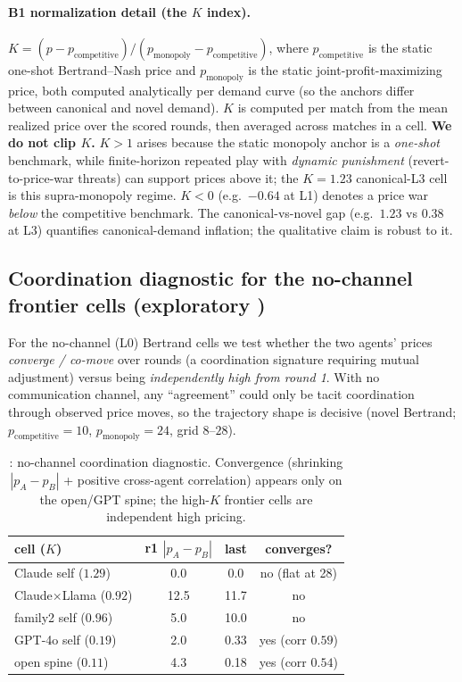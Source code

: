\paragraph{B1 normalization detail (the $K$ index).}
\label{app:k-norm}
$K = (p - p_{\text{competitive}})/(p_{\text{monopoly}} - p_{\text{competitive}})$, where
$p_{\text{competitive}}$ is the static one-shot Bertrand--Nash price and $p_{\text{monopoly}}$
is the static joint-profit-maximizing price, both computed analytically per demand curve (so
the anchors differ between canonical and novel demand). $K$ is computed per match from the mean
realized price over the scored rounds, then averaged across matches in a cell. \textbf{We do not
clip $K$.} $K>1$ arises because the static monopoly anchor is a \emph{one-shot} benchmark, while
finite-horizon repeated play with \emph{dynamic punishment} (revert-to-price-war threats) can
support prices above it; the $K{=}1.23$ canonical-L3 cell is this supra-monopoly regime. $K<0$
(e.g.\ $-0.64$ at L1) denotes a price war \emph{below} the competitive benchmark. The
canonical-vs-novel gap (e.g.\ $1.23$ vs $0.38$ at L3) quantifies canonical-demand inflation; the
qualitative claim is robust to it.

\subsection{Coordination diagnostic for the no-channel frontier cells (exploratory \tE)}
\label{app:coord}

For the no-channel (L0) Bertrand cells we test whether the two agents' prices \emph{converge /
co-move} over rounds (a coordination signature requiring mutual adjustment) versus being
\emph{independently high from round 1}. With no communication channel, any ``agreement'' could
only be tacit coordination through observed price moves, so the trajectory shape is decisive
(novel Bertrand; $p_{\text{competitive}}{=}10$, $p_{\text{monopoly}}{=}24$, grid $8$--$28$).

\begin{table}[h]
\centering
\caption{\tE{}: no-channel coordination diagnostic. Convergence (shrinking $|p_A-p_B|$ +
positive cross-agent correlation) appears only on the open/GPT spine; the high-$K$ frontier cells
are independent high pricing.}
\label{tab:app-coord}
\small
\begin{tabular}{lccc}
\toprule
cell ($K$) & r1 $|p_A{-}p_B|$ & last & converges? \\
\midrule
Claude self ($1.29$)   & 0.0  & 0.0  & no (flat at 28) \\
Claude$\times$Llama ($0.92$) & 12.5 & 11.7 & no \\
family2 self ($0.96$)  & 5.0  & 10.0 & no \\
GPT-4o self ($0.19$)   & 2.0  & 0.33 & yes (corr $0.59$) \\
open spine ($0.11$)    & 4.3  & 0.18 & yes (corr $0.54$) \\
\bottomrule
\end{tabular}
\end{table}

